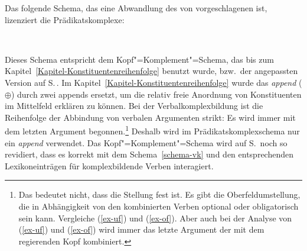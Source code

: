 Das folgende Schema, das eine Abwandlung des von \citeauthor{HN94a} vorgeschlagenen ist, lizenziert die Prädikatskomplexe:
\begin{samepage}
\begin{schema}[Prädikatskomplexschema]
\label{schema-vk}
 \impl\\
\end{schema}
\end{samepage}
%
Dieses Schema entspricht dem Kopf"=Komplement"=Schema, das bis zum Kapitel~\ref{Kapitel-Konstituentenreihenfolge}
benutzt wurde, bzw.\ der angepassten Version auf S.\,\pageref{schema-head-arg}.
Im Kapitel~\ref{Kapitel-Konstituentenreihenfolge} wurde das \emph{append} ($\oplus$) durch zwei appends
ersetzt, um die relativ freie Anordnung von Konstituenten im Mittelfeld erklären zu können.
Bei der Verbalkomplexbildung ist die Reihenfolge der Abbindung von verbalen Argumenten strikt: Es wird
immer mit dem letzten Argument begonnen.\footnote{%
  Das bedeutet nicht, dass die Stellung fest ist. Es gibt die Oberfeldumstellung, die in
  Abhängigkeit von den kombinierten Verben optional oder obligatorisch sein kann. Vergleiche
  (\ref{ex-uf}) und (\ref{ex-of}). Aber auch bei der Analyse von (\ref{ex-uf}) und (\ref{ex-of})
  wird immer das letzte Argument der \compsl mit dem regierenden Kopf kombiniert.
} Deshalb wird im Prädikatskomplexschema nur ein \emph{append} 
verwendet. Das Kopf"=Komplement"=Schema wird auf S.\,\pageref{schema-bin} noch so revidiert,
dass es korrekt mit dem Schema~\ref{schema-vk} und den entsprechenden Lexikoneinträgen für komplexbildende
Verben interagiert.

